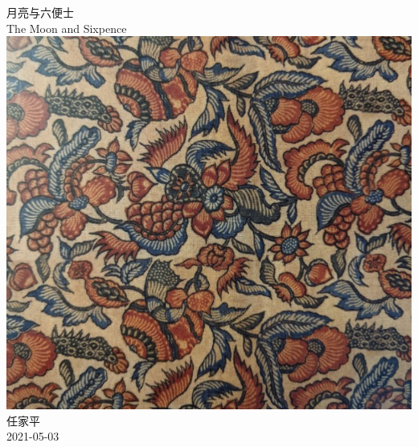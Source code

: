 \documentclass[a4paper, 12pt]{article}
\begin{document}
\begin{center}
    {\Huge 
        月亮与六便士 }\\[12pt]
    {\huge 
        The Moon and Sixpence}\\[20pt]
    
    \includegraphics[scale=0.8]{figure/cover.jpg} 
    \\[20pt] 

    {\Large 
        任家平\\[12pt]
        2021-05-03}
\end{center}
\thispagestyle{empty}



\newpage
{}
\tableofcontents
\newpage
{}

\end{document}
